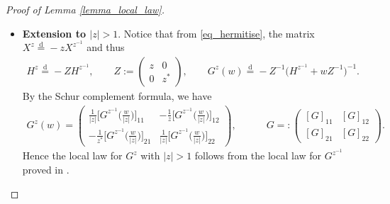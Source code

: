\documentclass[10pt,reqno]{amsart}
\numberwithin{equation}{section}
\numberwithin{figure}{section}
\theoremstyle{plain}
\newcommand{\<}{\langle}
\renewcommand{\>}{\rangle}
\begin{document}
\begin{proof}[Proof of Lemma \ref{lemma_local_law}]
\begin{itemize}
      \item[(2)] \textbf{Extension to $|z|> 1$}.
     Notice that from \eqref{eq_hermitise}, the matrix $X^{z}\overset{\mathrm{d}}{=}-zX^{z^{-1}}$ and thus 
     \begin{align}
     H^{z}\overset{\mathrm{d}}{=} - Z H^{z^{-1}}, \qquad Z:=\begin{pmatrix}
		z  &   0 \\
		0    & z^*
	\end{pmatrix}, \qquad G^{z}(w)\overset{\mathrm{d}}{=}-Z^{-1} \Big(H^{z^{-1}}+wZ^{-1}\Big)^{-1}.
    \end{align}   
    By the Schur complement formula, we have
    \begin{align}\label{eq_G_inverse}
    G^{z}(w)=\begin{pmatrix}
		\frac{1}{|z|} \big[G^{z^{-1}}\big(\frac{w}{|z|}\big)\big]_{11}  & -\frac{1}{z}  \big[G^{z^{-1}}\big(\frac{w}{|z|}\big)\big]_{12} \\
		-\frac{1}{z^*}\big[G^{z^{-1}}\big(\frac{w}{|z|}\big)\big]_{21}    & \frac{1}{|z|} \big[G^{z^{-1}}\big(\frac{w}{|z|}\big)\big]_{22}
	\end{pmatrix}, \qquad \quad G=:\begin{pmatrix}
		[G]_{11}  & [G]_{12} \\
		[G]_{21}    & [G]_{22}
	\end{pmatrix}.
    \end{align}
    Hence the local law for $G^{z}$ with $|z|>1$ follows from the local law for $G^{z^{-1}}$ proved in \cite{chafai-garcia-zelada-xu}. 
     
     \end{itemize}
     
     
  

    
       \end{proof}  
     
\end{document}
